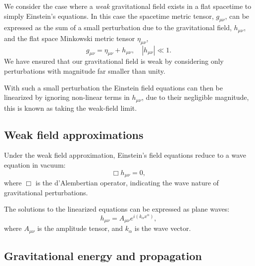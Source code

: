 We consider the case where a \textit{weak} gravitational field exists in a flat spacetime to simply Einstein's equations. In this case the spacetime metric tensor, $g_{\mu\nu}$, can be expressed as the sum of a small perturbation due to the gravitational field, $h_{\mu\nu}$, and the flat space Minkowski metric tensor $\eta_{\mu\nu}$,
%
\begin{equation}
g_{\mu\nu} = \eta_{\mu\nu} + h_{\mu\nu}, \quad |h_{\mu\nu}| \ll 1.
\end{equation}
%
We have ensured that our gravitational field is weak by considering only perturbations with magnitude far smaller than unity.

With such a small perturbation the Einstein field equations can then be linearized by ignoring non-linear terms in $h_{\mu\nu}$, due to their negligible magnitude, this is known as taking the weak-field limit.




\subsection{\label{2:sec:weak-field}Weak field approximations}




Under the weak field approximation, Einstein's field equations reduce to a wave equation in vacuum:
\begin{equation}
\Box h_{\mu\nu} = 0,
\end{equation}
where $\Box$ is the d'Alembertian operator, indicating the wave nature of gravitational perturbations.

The solutions to the linearized equations can be expressed as plane waves:
\begin{equation}
h_{\mu\nu} = A_{\mu\nu} e^{i(k_\alpha x^\alpha)},
\end{equation}
where $A_{\mu\nu}$ is the amplitude tensor, and $k_\alpha$ is the wave vector.




\subsection{\label{2:sec:gravitational-energy}Gravitational energy and propagation}

